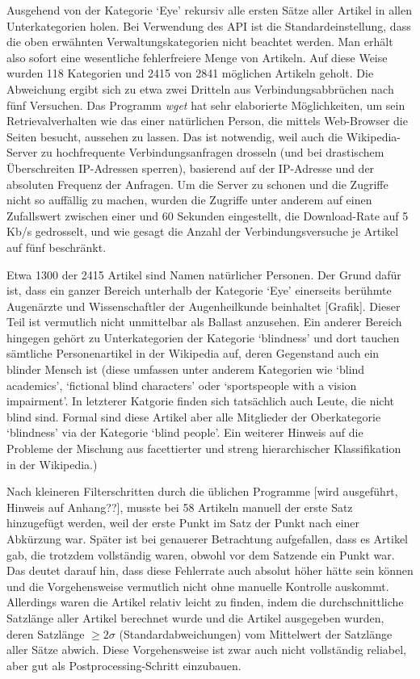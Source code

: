\documentclass[pagesize,DIV=calc,12pt,draft]{scrreprt}
\begin{document}
\begin{inparaenum}
\item Ausgehend von der Kategorie `Eye' rekursiv alle ersten Sätze aller Artikel in allen Unterkategorien holen. 
Bei Verwendung des API ist die Standardeinstellung, dass die oben erwähnten Verwaltungskategorien nicht beachtet werden. 
Man erhält also sofort eine wesentliche fehlerfreiere Menge von Artikeln. 
Auf diese Weise wurden 118 Kategorien und 2415 von 2841 möglichen Artikeln geholt. 
Die Abweichung ergibt sich zu etwa zwei Dritteln aus Verbindungsabbrüchen nach fünf Versuchen. 
Das Programm \emph{wget} hat sehr elaborierte Möglichkeiten, um sein Retrievalverhalten wie das einer natürlichen Person, die mittels Web-Browser die Seiten besucht, aussehen zu lassen. 
Das ist notwendig, weil auch die Wikipedia-Server zu hochfrequente Verbindungsanfragen drosseln (und bei drastischem Überschreiten IP-Adressen sperren), basierend auf der IP-Adresse und der absoluten Frequenz der Anfragen. 
Um die Server zu schonen und die Zugriffe nicht so auffällig zu machen, wurden die Zugriffe unter anderem auf einen Zufallswert zwischen einer und 60 Sekunden eingestellt, die Download-Rate auf 5 Kb/s gedrosselt, und wie gesagt die Anzahl der Verbindungsversuche je Artikel auf fünf beschränkt. 

Etwa 1300 der 2415 Artikel sind Namen natürlicher Personen. 
Der Grund dafür ist, dass ein ganzer Bereich unterhalb der Kategorie `Eye' einerseits berühmte Augenärzte und Wissenschaftler der Augenheilkunde beinhaltet {[}Grafik{]}. 
Dieser Teil ist vermutlich nicht unmittelbar als Ballast anzusehen. 
Ein anderer Bereich hingegen gehört zu Unterkategorien der Kategorie `blindness' und dort tauchen sämtliche Personenartikel in der Wikipedia auf, deren Gegenstand auch ein blinder Mensch ist (diese umfassen unter anderem Kategorien wie `blind academics', `fictional blind characters' oder `sportspeople with a vision impairment'. 
In letzterer Katgorie finden sich tatsächlich auch Leute, die nicht blind sind. 
Formal sind diese Artikel aber alle Mitglieder der Oberkategorie `blindness' via der Kategorie `blind people'. 
Ein weiterer Hinweis auf die Probleme der Mischung aus facettierter und streng hierarchischer Klassifikation in der Wikipedia.) 

\item Nach kleineren Filterschritten durch die üblichen Programme {[}wird ausgeführt, Hinweis auf Anhang??{]}, musste bei 58 Artikeln manuell der erste Satz hinzugefügt werden, weil der erste Punkt im Satz der Punkt nach einer Abkürzung war. 
Später ist bei genauerer Betrachtung aufgefallen, dass es Artikel gab, die trotzdem vollständig waren, obwohl vor dem Satzende ein Punkt war. 
Das deutet darauf hin, dass diese Fehlerrate auch absolut höher hätte sein können und die Vorgehensweise vermutlich nicht ohne manuelle Kontrolle auskommt. 
Allerdings waren die Artikel relativ leicht zu finden, indem die durchschnittliche Satzlänge aller Artikel berechnet wurde und die Artikel ausgegeben wurden, deren Satzlänge $\geq 2 \sigma $ (Standardabweichungen) vom Mittelwert der Satzlänge aller Sätze abwich. 
Diese Vorgehensweise ist zwar auch nicht vollständig reliabel, aber gut als Postprocessing-Schritt einzubauen. 


\end{inparaenum}
\end{document}

